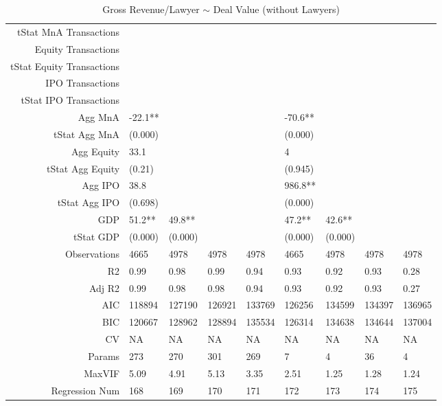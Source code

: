 \begin{table}[ht]
\begin{tabular}{rllllllll}
  tStat MnA Transactions &  &  &  &  &  &  &  &  \\ 
  Equity Transactions &  &  &  &  &  &  &  &  \\ 
  tStat Equity Transactions &  &  &  &  &  &  &  &  \\ 
  IPO Transactions &  &  &  &  &  &  &  &  \\ 
  tStat IPO Transactions &  &  &  &  &  &  &  &  \\ 
  Agg MnA & -22.1** &  &  &  & -70.6** &  &  &  \\ 
  tStat Agg MnA & (0.000) &  &  &  & (0.000) &  &  &  \\ 
  Agg Equity & 33.1 &  &  &  & 4 &  &  &  \\ 
  tStat Agg Equity & (0.21) &  &  &  & (0.945) &  &  &  \\ 
  Agg IPO & 38.8 &  &  &  & 986.8** &  &  &  \\ 
  tStat Agg IPO & (0.698) &  &  &  & (0.000) &  &  &  \\ 
  GDP & 51.2** & 49.8** &  &  & 47.2** & 42.6** &  &  \\ 
  tStat GDP & (0.000) & (0.000) &  &  & (0.000) & (0.000) &  &  \\ 
  Observations & 4665 & 4978 & 4978 & 4978 & 4665 & 4978 & 4978 & 4978 \\ 
  R2 & 0.99 & 0.98 & 0.99 & 0.94 & 0.93 & 0.92 & 0.93 & 0.28 \\ 
  Adj R2 & 0.99 & 0.98 & 0.98 & 0.94 & 0.93 & 0.92 & 0.93 & 0.27 \\ 
  AIC & 118894 & 127190 & 126921 & 133769 & 126256 & 134599 & 134397 & 136965 \\ 
  BIC & 120667 & 128962 & 128894 & 135534 & 126314 & 134638 & 134644 & 137004 \\ 
  CV & NA & NA & NA & NA & NA & NA & NA & NA \\ 
  Params & 273 & 270 & 301 & 269 & 7 & 4 & 36 & 4 \\ 
  MaxVIF & 5.09 & 4.91 & 5.13 & 3.35 & 2.51 & 1.25 & 1.28 & 1.24 \\ 
  Regression Num & 168 & 169 & 170 & 171 & 172 & 173 & 174 & 175 \\ 
   \hline
\end{tabular}
\caption{Gross Revenue/Lawyer $\sim$ Deal Value (without Lawyers)} 
\end{table}
